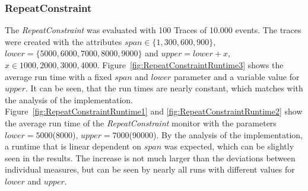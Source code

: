 \subsubsection{RepeatConstraint}
	\label{sec_runtimeRepeat}
	The \textit{RepeatConstraint} was evaluated with 100 Traces of 10.000 events. The traces were created with the attributes $span\in\{1,300,600,900\}$, $lower=\{5000,6000,7000,8000,9000\}$ and $upper=lower+x$, $x\in{1000,2000,3000,4000}$.  Figure~\ref{fig:RepeatConstraintRuntime3} shows the average run time with a fixed $span$ and $lower$ parameter and a variable value for $upper$. It can be seen, that the run times are nearly constant, which matches with the analysis of the implementation.\\ Figure~\ref{fig:RepeatConstraintRuntime1} and \ref{fig:RepeatConstraintRuntime2} show the average run time of the \textit{RepeatConstraint} monitor with the parameters $lower=5000$(8000), $upper=7000$(90000). By the analysis of the implementation, a runtime that is linear dependent on $span$ was expected, which can be slightly seen in the results. The increase is not much larger than the deviations between individual measures, but can be seen by nearly all runs with different values for $lower$ and $upper$. 

